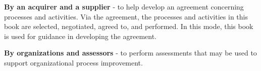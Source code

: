 \begin{adjustwidth}{0em}{0pt}
\begin{compactitem}
			\item {\bf By an acquirer and a supplier} - to help develop an agreement concerning processes and activities. Via the agreement, the processes and activities in this book are selected, negotiated, agreed to, and performed. In this mode, this book is used for guidance in developing the agreement. \\

			\item {\bf By organizations and assessors} - to perform assessments that may be used to support organizational process improvement.

		\end{compactitem}

\end{adjustwidth} 
